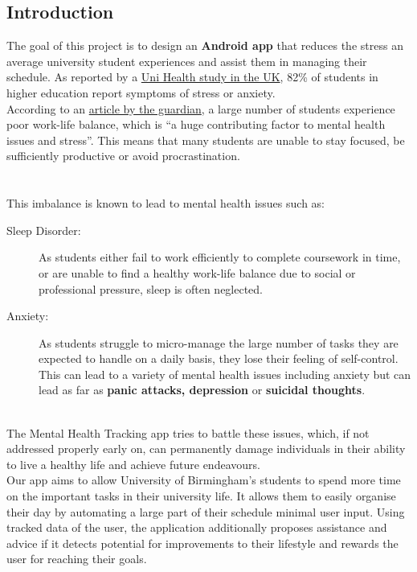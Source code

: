 \documentclass[a4paper,11pt]{article} %
\begin{document}
\subsection{Introduction}
The goal of this project is to design an \textbf{Android app} that reduces the stress an average university
student experiences and assist them in managing their schedule.
As reported by a \href{https://www.thenationalstudent.com/Student/2017-08-31/82_of_students_suffer_from_stress_and_anxiety.html}{Uni Health study in the UK}, 82\% of students in higher 
education report symptoms of stress or anxiety.\\
According to an \href{https://www.theguardian.com/education/2019/may/31/why-are-students-at-university-so-stressed}{article by the guardian}, a large number of students 
experience poor work-life balance, which is ``a huge contributing factor to mental health issues and stress''.
This means that many students are unable to stay focused, be sufficiently productive 
or avoid procrastination. \\
\\
\\
This imbalance is known to lead to mental health issues such as:
\begin{description}
    \item[Sleep Disorder:] As students either fail to work efficiently to complete coursework 
    in time, or are unable to find a healthy work-life balance due to social or professional 
    pressure, sleep is often neglected.
    \item[Anxiety:] As students struggle to micro-manage the large number of tasks they are 
    expected to handle on a daily basis, they lose their feeling of self-control. This can 
    lead to a variety of mental health issues including anxiety but can lead as far 
    as \textbf{panic attacks, depression} or \textbf{suicidal thoughts}.
\end{description}
\ \\
The Mental Health Tracking app tries to battle these issues, which, if not addressed properly early on, 
can permanently damage individuals in their ability to live a healthy life and achieve future endeavours.\\

Our app aims to allow University of Birmingham’s students to spend more time on the important tasks in 
their university life. It allows them to easily organise their day by automating a large part of their 
schedule minimal user input.  
Using tracked data of the user, the application additionally proposes assistance and advice if it 
detects potential for improvements to their lifestyle and rewards the user for reaching their goals. 
\end{document}
